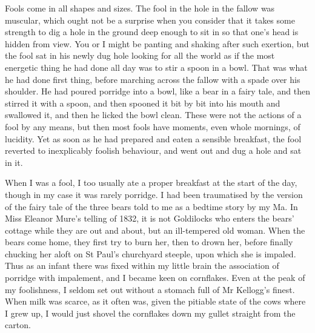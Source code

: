 Fools come in all shapes and sizes. The fool in the hole in the fallow was muscular, which ought not be a surprise when you consider that it takes some strength to dig a hole in the ground deep enough to sit in so that one's head is hidden from view. You or I might be panting and shaking after such exertion, but the fool sat in his newly dug hole looking for all the world as if the most energetic thing he had done all day was to stir a spoon in a bowl. That was what he had done first thing, before marching across the fallow with a spade over his shoulder. He had poured porridge into a bowl, like a bear in a fairy tale, and then stirred it with a spoon, and then spooned it bit by bit into his mouth and swallowed it, and then he licked the bowl clean. These were not the actions of a fool by any means, but then most fools have moments, even whole mornings, of lucidity. Yet as soon as he had prepared and eaten a sensible breakfast, the fool reverted to inexplicably foolish behaviour, and went out and dug a hole and sat in it.

When I was a fool, I too usually ate a proper breakfast at the start of the day, though in my case it was rarely porridge. I had been traumatised by the version of the fairy tale of the three bears told to me as a bedtime story by my Ma. In Miss Eleanor Mure's telling of 1832, it is not Goldilocks who enters the bears' cottage while they are out and about, but an ill-tempered old woman. When the bears come home, they first try to burn her, then to drown her, before finally chucking her aloft on St Paul's churchyard steeple, upon which she is impaled. Thus as an infant there was fixed within my little brain the association of porridge with impalement, and I became keen on cornflakes. Even at the peak of my foolishness, I seldom set out without a stomach full of Mr Kellogg's finest. When milk was scarce, as it often was, given the pitiable state of the cows where I grew up, I would just shovel the cornflakes down my gullet straight from the carton.

